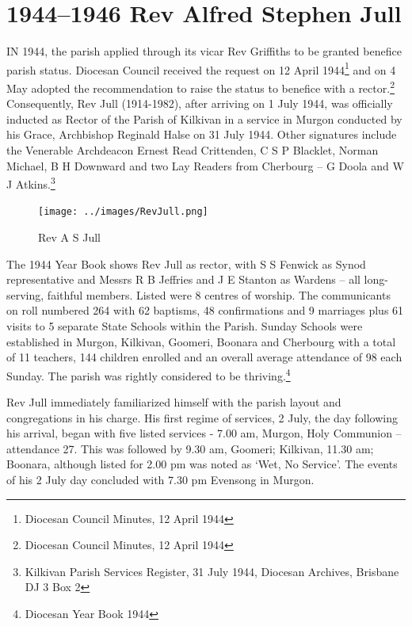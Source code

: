 \printendnotes[custom]
\setcounter{endnote}{0}
\chapter{1944--1946 Rev Alfred Stephen Jull}
\nobalance


\lettrine[lines=3]{I}{N}
 1944, the parish applied through its vicar Rev Griffiths to be granted benefice parish status. Diocesan Council received the request on 12 April 1944\footnote{Diocesan Council Minutes, 12 April 1944} and on 4 May adopted the recommendation to raise the status to benefice with a rector.\footnote{Diocesan Council Minutes, 12 April 1944} Consequently, Rev Jull (1914-1982), after arriving on 1 July 1944, was officially inducted as Rector of the Parish of Kilkivan in a service in Murgon conducted by his Grace, Archbishop Reginald Halse on 31 July 1944. Other signatures include the Venerable Archdeacon Ernest Read Crittenden, C S P Blacklet, Norman Michael, B H Downward and two Lay Readers from Cherbourg -- G Doola and W J Atkins.\footnote{Kilkivan Parish Services Register, 31 July 1944, Diocesan Archives, Brisbane DJ 3 Box 2}







\begin{figure}
\begin{center}
\texttt{[image: ../images/RevJull.png]}
\caption{Rev A S Jull}
\end{center}
\end{figure}




The 1944 Year Book shows Rev Jull as rector, with S S Fenwick as Synod representative and Messrs R B Jeffries and J E Stanton as Wardens -- all long-serving, faithful members. Listed were 8 centres of worship. The communicants on roll numbered 264 with 62 baptisms, 48 confirmations and 9 marriages plus 61 visits to 5 separate State Schools within the Parish. Sunday Schools were established in Murgon, Kilkivan, Goomeri, Boonara and Cherbourg with a total of 11 teachers, 144 children enrolled and an overall average attendance of 98 each Sunday. The parish was rightly considered to be thriving.\footnote{Diocesan Year Book 1944}


Rev Jull immediately familiarized himself with the parish layout and congregations in his charge. His first regime of services, 2 July, the day following his arrival, began with five listed services - 7.00 am, Murgon, Holy Communion -- attendance 27. This was followed by 9.30 am, Goomeri; Kilkivan, 11.30 am; Boonara, although listed for 2.00 pm was noted as `Wet, No Service'. The events of his 2 July day concluded with 7.30 pm Evensong in Murgon.



